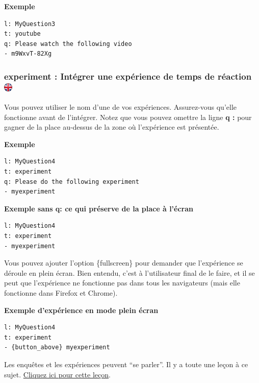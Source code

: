 \documentclass[
]{book}
\begin{document}
\textbf{Exemple}

\begin{verbatim}
l: MyQuestion3
t: youtube
q: Please watch the following video
- m9WxvT-82Xg
\end{verbatim}

\hypertarget{experiment-intuxe9grer-une-expuxe9rience-de-temps-de-ruxe9action}{%
\subsubsection[experiment : Intégrer une expérience de temps de réaction
]{\texorpdfstring{experiment : Intégrer une expérience de temps de
réaction
\href{https://www.psytoolkit.org/doc3.1.0/online-survey-syntax.html\#experiment}{\protect\includegraphics{img/ukflag.png}}}{experiment : Intégrer une expérience de temps de réaction }}\label{experiment-intuxe9grer-une-expuxe9rience-de-temps-de-ruxe9action}}

Vous pouvez utiliser le nom d'une de vos expériences. Assurez-vous
qu'elle fonctionne avant de l'intégrer. Notez que vous pouvez omettre la
ligne \textbf{q :} pour gagner de la place au-dessus de la zone où
l'expérience est présentée.

\textbf{Exemple}

\begin{verbatim}
l: MyQuestion4
t: experiment
q: Please do the following experiment
- myexperiment
\end{verbatim}

\textbf{Exemple sans q: ce qui préserve de la place à l'écran}

\begin{verbatim}
l: MyQuestion4
t: experiment
- myexperiment
\end{verbatim}

Vous pouvez ajouter l'option \{fullscreen\} pour demander que
l'expérience se déroule en plein écran. Bien entendu, c'est à
l'utilisateur final de le faire, et il se peut que l'expérience ne
fonctionne pas dans tous les navigateurs (mais elle fonctionne dans
Firefox et Chrome).

\textbf{Exemple d'expérience en mode plein écran}

\begin{verbatim}
l: MyQuestion4
t: experiment
- {button_above} myexperiment
\end{verbatim}

Les enquêtes et les expériences peuvent ``se parler''. Il y a toute une
leçon à ce sujet. \protect\hyperlink{s11}{Cliquez ici pour cette leçon}.
\end{document}
